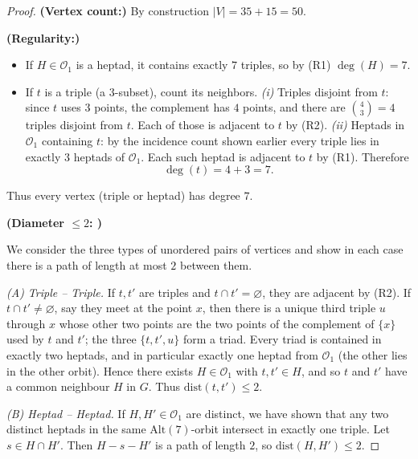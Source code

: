 \documentclass[12pt,a4paper,openany]{book}
\begin{document}
\begin{proof}
\textbf{(Vertex count:)} By construction $|V|=35+15=50$.

\medskip
\noindent\textbf{(Regularity:)}
\begin{itemize}
  \item If $H\in\mathcal O_1$ is a heptad, it contains exactly $7$ triples, so by (R1)
    $\deg(H)=7$.

  \item If $t$ is a triple (a 3-subset), count its neighbors.  
    \emph{(i)} Triples disjoint from $t$: since $t$ uses $3$ points, the complement has $4$ points, and there are $\binom{4}{3}=4$ triples disjoint from $t$. Each of those is adjacent to $t$ by (R2).  
    \emph{(ii)} Heptads in $\mathcal O_1$ containing $t$: by the incidence count shown earlier every triple lies in exactly $3$ heptads of $\mathcal O_1$. Each such heptad is adjacent to $t$ by (R1).  
    Therefore
    \[
      \deg(t)=4 + 3 = 7.
    \]
\end{itemize}
Thus every vertex (triple or heptad) has degree $7$.

\medskip\noindent\textbf{(Diameter $\le 2$: )}

We consider the three types of unordered pairs of vertices and show in each case there is a path of length at most $2$ between them.

\emph{(A) Triple -- Triple.} If $t,t'$ are triples and $t\cap t'=\varnothing$, they are adjacent by (R2). If $t\cap t'\neq\varnothing$, say they meet at the point $x$, then there is a unique third triple $u$ through $x$ whose other two points are the two points of the complement of $\{x\}$ used by $t$ and $t'$; the three $\{t,t',u\}$ form a triad. Every triad is contained in exactly two heptads, and in particular exactly one heptad from $\mathcal O_1$ (the other lies in the other orbit). Hence there exists $H\in\mathcal O_1$ with $t,t'\in H$, and so $t$ and $t'$ have a common neighbour $H$ in $G$. Thus $\mathrm{dist}(t,t')\le2$.

\emph{(B) Heptad -- Heptad.} If $H,H'\in\mathcal O_1$ are distinct, we have shown that any two distinct heptads in the same $\mathrm{Alt}(7)$-orbit intersect in exactly one triple. Let $s\in H\cap H'$. Then $H-s-H'$ is a path of length $2$, so $\mathrm{dist}(H,H')\le2$.


\end{proof}
\end{document}
